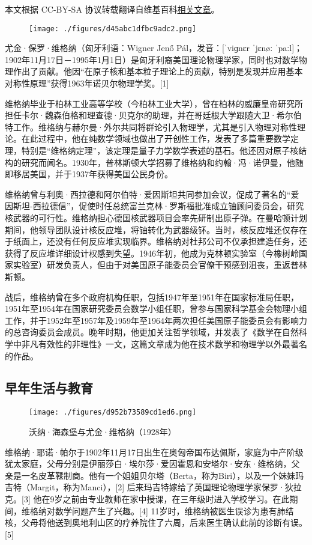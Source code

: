 
本文根据 CC-BY-SA 协议转载翻译自维基百科\href{https://en.wikipedia.org/wiki/Eugene_Wigner}{相关文章}。

\begin{figure}[ht]
\centering
\texttt{[image: ./figures/d45abc1dfbc9adc2.png]}
\caption{} \label{fig_YJwgn_1}
\end{figure}
尤金·保罗·维格纳（匈牙利语：Wigner Jenő Pál，发音：[ˈviɡnɛr ˈjɛnøː ˈpaːl]；1902年11月17日－1995年1月1日）是匈牙利裔美国理论物理学家，同时也对数学物理作出了贡献。他因“在原子核和基本粒子理论上的贡献，特别是发现并应用基本对称性原理”获得1963年诺贝尔物理学奖。[1]

维格纳毕业于柏林工业高等学校（今柏林工业大学），曾在柏林的威廉皇帝研究所担任卡尔·魏森伯格和理查德·贝克尔的助理，并在哥廷根大学跟随大卫·希尔伯特工作。维格纳与赫尔曼·外尔共同将群论引入物理学，尤其是引入物理对称性理论。在此过程中，他在纯数学领域也做出了开创性工作，发表了多篇重要数学定理，特别是“维格纳定理”，该定理是量子力学数学表述的基石。他还因对原子核结构的研究而闻名。1930年，普林斯顿大学招募了维格纳和约翰·冯·诺伊曼，他随即移居美国，并于1937年获得美国公民身份。

维格纳曾与利奥·西拉德和阿尔伯特·爱因斯坦共同参加会议，促成了著名的“爱因斯坦-西拉德信”，促使时任总统富兰克林·罗斯福批准成立铀顾问委员会，研究核武器的可行性。维格纳担心德国核武器项目会率先研制出原子弹。在曼哈顿计划期间，他领导团队设计核反应堆，将铀转化为武器级钚。当时，核反应堆还仅存在于纸面上，还没有任何反应堆实现临界。维格纳对杜邦公司不仅承担建造任务，还获得了反应堆详细设计权感到失望。1946年初，他成为克林顿实验室（今橡树岭国家实验室）研发负责人，但由于对美国原子能委员会官僚干预感到沮丧，重返普林斯顿。

战后，维格纳曾在多个政府机构任职，包括1947年至1951年在国家标准局任职，1951年至1954年在国家研究委员会数学小组任职，曾参与国家科学基金会物理小组工作，并于1952年至1957年及1959年至1964年两次担任美国原子能委员会有影响力的总咨询委员会成员。晚年时期，他更加关注哲学领域，并发表了《数学在自然科学中非凡有效性的非理性》一文，这篇文章成为他在技术数学和物理学以外最著名的作品。
\subsection{早年生活与教育}
\begin{figure}[ht]
\centering
\texttt{[image: ./figures/d952b73589cd1ed6.png]}
\caption{沃纳·海森堡与尤金·维格纳（1928年）} \label{fig_YJwgn_3}
\end{figure}
维格纳·耶诺·帕尔于1902年11月17日出生在奥匈帝国布达佩斯，家庭为中产阶级犹太家庭，父母分别是伊丽莎白·埃尔莎·爱因霍恩和安塔尔·安东·维格纳，父亲是一名皮革鞣制商。他有一个姐姐贝尔塔（Berta，称为Biri），以及一个妹妹玛吉特（Margit，称为Manci），[2] 后来玛吉特嫁给了英国理论物理学家保罗·狄拉克。[3] 他在9岁之前由专业教师在家中授课，在三年级时进入学校学习。在此期间，维格纳对数学问题产生了兴趣。[4] 11岁时，维格纳被医生误诊为患有肺结核，父母将他送到奥地利山区的疗养院住了六周，后来医生确认此前的诊断有误。[5]

